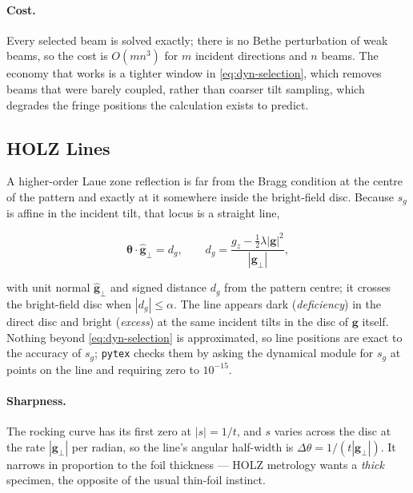 \paragraph{Cost.} Every selected beam is solved exactly; there is no Bethe perturbation of
weak beams, so the cost is \(O(m n^{3})\) for \(m\) incident directions and \(n\) beams. The
economy that works is a tighter window in \eqref{eq:dyn-selection}, which removes beams that
were barely coupled, rather than coarser tilt sampling, which degrades the fringe positions
the calculation exists to predict.

\subsection{HOLZ Lines}

A higher-order Laue zone reflection is far from the Bragg condition at the centre of the
pattern and exactly at it somewhere inside the bright-field disc. Because \(s_g\) is affine in
the incident tilt, that locus is a straight line,

\begin{equation}
  \boldsymbol{\theta}\cdot\hat{\mathbf{g}}_{\perp} = d_{g},
  \qquad
  d_{g} = \frac{g_{z} - \tfrac{1}{2}\lambda|\mathbf{g}|^{2}}{|\mathbf{g}_{\perp}|},
  \label{eq:holz-line}
\end{equation}

with unit normal \(\hat{\mathbf{g}}_{\perp}\) and signed distance \(d_g\) from the pattern
centre; it crosses the bright-field disc when \(|d_g| \le \alpha\). The line appears dark
(\emph{deficiency}) in the direct disc and bright (\emph{excess}) at the same incident tilts in
the disc of \(\mathbf{g}\) itself. Nothing beyond \eqref{eq:dyn-selection} is approximated, so
line positions are exact to the accuracy of \(s_g\); \texttt{pytex} checks them by asking the
dynamical module for \(s_g\) at points on the line and requiring zero to \(10^{-15}\).

\paragraph{Sharpness.} The rocking curve has its first zero at \(|s| = 1/t\), and \(s\) varies
across the disc at the rate \(|\mathbf{g}_{\perp}|\) per radian, so the line's angular
half-width is \(\Delta\theta = 1/(t|\mathbf{g}_{\perp}|)\). It narrows in proportion to the foil
thickness --- HOLZ metrology wants a \emph{thick} specimen, the opposite of the usual thin-foil
instinct.

